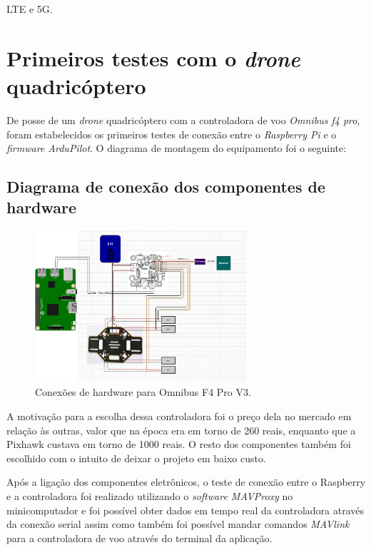 \documentclass[12pt,a4paper,oneside]{book}
\begin{document}
LTE e 5G.

\section{Primeiros testes com o \textit{drone} quadricóptero}

De posse de um \textit{drone} quadricóptero com a controladora de voo \textit{Omnibus f4 pro}, foram estabelecidos os primeiros testes de conexão entre o \textit{Raspberry Pi} e o \textit{firmware ArduPilot}. O diagrama de montagem do equipamento foi o seguinte:

\subsection{Diagrama de conexão dos componentes de hardware}
%
\begin{figure}[!htbp]
  \centering
  \includegraphics[width=0.7\textwidth]{Images/Diagramas/hardware_connections.png}
  \caption{Conexões de hardware para Omnibus F4 Pro V3.}
  \label{fig:hardware_connections.png.0}
\end{figure}
%
A motivação para a escolha dessa controladora foi o preço dela no mercado em relação às outras, valor que na época era em torno de 260 reais, enquanto que a Pixhawk custava em torno de 1000 reais. O resto dos componentes também foi escolhido com o intuito de deixar o projeto em baixo custo. 
%

Após a ligação dos componentes eletrônicos, o teste de conexão entre o Raspberry e a controladora foi realizado utilizando o \textit{software MAVProxy} no minicomputador e foi possível obter dados em tempo real da controladora através da conexão serial assim como também foi possível mandar comandos \textit{MAVlink} para a controladora de voo através do terminal da aplicação.
\end{document}
